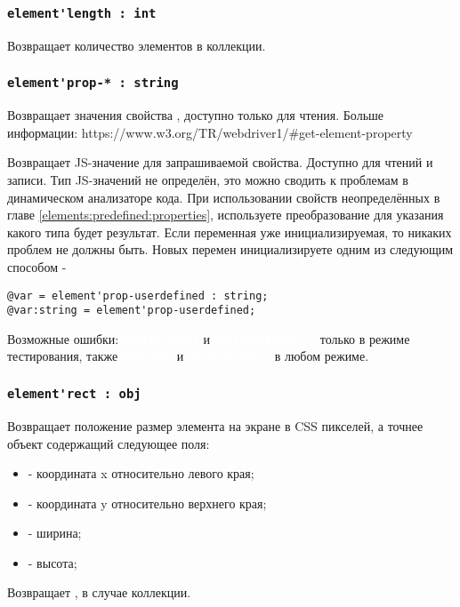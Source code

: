 \documentclass[a4paper, 14pt]{extarticle}
\newcommand{\ferror}[1]{{\fontsize{11pt}{12pt} \tt \colorbox{function}{\textcolor{white}{#1}}}}
\newenvironment{icItems}
	{ \begin{itemize} [noitemsep,nolistsep] }
	{ \end{itemize} }
\begin{document}
\subsubsection{\lstinline|element'length : int|}

Возвращает количество элементов в коллекции.

\subsubsection{\lstinline|element'prop-* : string|}

\code{[w3c]} Возвращает значения свойства \code{*}, доступно только для чтения. Больше информации: https://www.w3.org/TR/webdriver1/\#get-element-property

\code{[icL]}  Возвращает JS-значение для запрашиваемой свойства. Доступно для чтений и записи. Тип JS-значений не определён, это можно сводить к проблемам в динамическом анализаторе кода. При использовании свойств неопределённых в главе \ref{elements:predefined:properties}, используете преобразование для указания какого типа будет результат. Если переменная уже инициализируемая, то никаких проблем не должны быть. Новых перемен инициализируете одним из следующим способом -
\begin{lstlisting}[numbers=none]
@var = element'prop-userdefined : string;
@var:string = element'prop-userdefined;
\end{lstlisting}

Возможные ошибки: \ferror{EmptyElement} и \ferror{MultipleElements} только в режиме тестирования, также \ferror{NoWindow} и \ferror{NoSuchElement} в любом режиме.

\subsubsection{\lstinline|element'rect : obj|}

Возвращает положение размер элемента на экране в CSS пикселей, а точнее объект содержащий следующее поля:
\begin{icItems}
	\item {} - координата x относительно левого края;
	\item {} - координата y относительно верхнего края;
	\item {} - ширина;
	\item {} - высота;
\end{icItems}

\code{[icL]} Возвращает \set, в случае коллекции.
\end{document}
